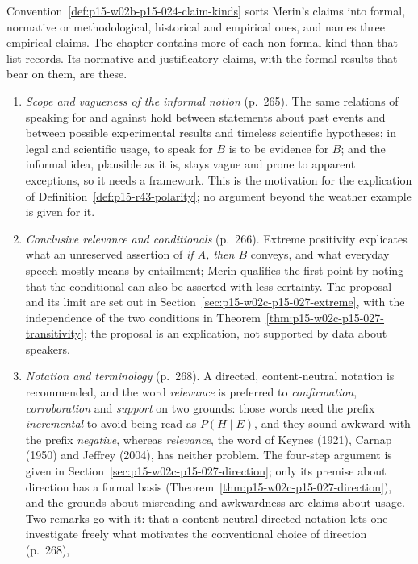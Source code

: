 Convention~\ref{def:p15-w02b-p15-024-claim-kinds} sorts Merin's claims
into formal, normative or methodological, historical and empirical
ones, and names three empirical claims. The chapter contains more of
each non-formal kind than that list records. Its normative and
justificatory claims, with the formal results that bear on them, are
these.
\begin{enumerate}
\item \emph{Scope and vagueness of the informal notion} (p.~265). The
  same relations of speaking for and against hold between statements
  about past events and between possible experimental results and
  timeless scientific hypotheses; in legal and scientific usage, to
  speak for \(B\) is to be evidence for \(B\); and the
  informal idea, plausible as it is, stays vague and prone to apparent
  exceptions, so it needs a framework. This is the motivation for the
  explication of Definition~\ref{def:p15-r43-polarity}; no argument
  beyond the weather example is given for it.
\item \emph{Conclusive relevance and conditionals} (p.~266). Extreme
  positivity explicates what an unreserved assertion of \emph{if \(A\),
  then \(B\)} conveys, and what everyday speech mostly means by
  entailment; Merin qualifies the first point by noting that the
  conditional can also be asserted with less certainty. The proposal and
  its limit are set out in Section~\ref{sec:p15-w02c-p15-027-extreme},
  with the independence of the two conditions in
  Theorem~\ref{thm:p15-w02c-p15-027-transitivity}; the proposal is an
  explication, not supported by data about speakers.
\item \emph{Notation and terminology} (p.~268). A directed,
  content-neutral notation is recommended, and the word \emph{relevance}
  is preferred to \emph{confirmation}, \emph{corroboration} and
  \emph{support} on two grounds: those words need the prefix
  \emph{incremental} to avoid being read as \(P(H\mid E)\), and they sound
  awkward with the prefix \emph{negative}, whereas \emph{relevance}, the
  word of Keynes (1921), Carnap (1950) and Jeffrey (2004), has neither
  problem. The four-step argument is given in
  Section~\ref{sec:p15-w02c-p15-027-direction}; only its premise about
  direction has a formal basis
  (Theorem~\ref{thm:p15-w02c-p15-027-direction}), and the grounds about
  misreading and awkwardness are claims about usage. Two remarks go with
  it: that a content-neutral directed notation lets one investigate
  freely what motivates the conventional choice of direction (p.~268),

\end{enumerate}
